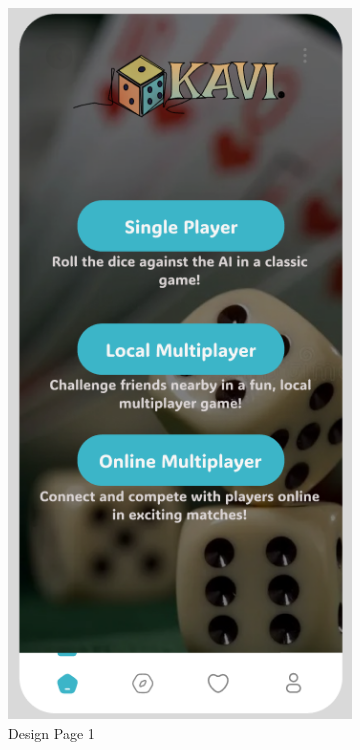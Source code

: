 \begin{figure}[ht!]
    \centering
    \begin{subfigure}[b]{0.48\textwidth}
        \centering
        \includegraphics[scale=0.45]{img/play.png}
        \caption{Design Page 1}
        \label{fig:figma_design1}
    \end{subfigure}
    \hspace{0.02\textwidth}
    \begin{subfigure}[b]{0.48\textwidth}
        \centering

\end{subfigure}
\end{figure}
